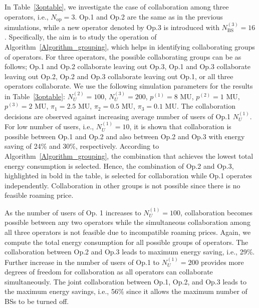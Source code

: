 \documentclass[10pt, letter, twocolumn]{IEEEtran}
\begin{document}
In Table~\ref{3optable}, we investigate the case of collaboration among three operators, i.e., $N_{\text{op}} = 3$. Op.1 and Op.2 are the same as in the previous simulations, while a new operator denoted by Op.3 is introduced with $N_{\text{BS}}^{(3)} = 16$. Specifically, the aim is to study the operation of Algorithm~\ref{Algorithm_grouping}, which helps in identifying collaborating groups of operators. For three operators, the possible collaborating groups can be as follows; Op.1 and Op.2 collaborate leaving out Op.3, Op.1 and Op.3 collaborate leaving out Op.2, Op.2 and Op.3 collaborate leaving out Op.1, or all three operators collaborate. We use the following simulation parameters for the results in Table~\ref{3optable}: $N_{U}^{(2)} = 100$, $N_{U}^{(3)} = 200$, $p^{(1)} = 8$ MU, $p^{(2)} = 1$ MU, $p^{(3)} = 2$ MU, $\pi_{1} = 2.5$ MU, $\pi_{2} = 0.5$ MU, $\pi_{3} = 0.1$ MU. The collaboration decisions are observed against increasing average number of users of Op.1 $N_{U}^{(1)}$. For low number of users, i.e., $N_{U}^{(1)}=10$, it is shown that collaboration is possible between Op.1 and Op.2 and also between Op.2 and Op.3 with energy saving of 24\% and 30\%, respectively. According to Algorithm~\ref{Algorithm_grouping}, the combination that achieves the lowest total energy consumption is selected. Hence, the combination of Op.2 and Op.3, highlighted in bold in the table, is selected for collaboration while Op.1 operates independently. Collaboration in other groups is not possible since there is no feasible roaming price.

As the number of users of Op. 1 increases to $N_{U}^{(1)} = 100$, collaboration becomes possible between any two operators while the simultaneous collaboration among all three operators is not feasible due to incompatible roaming prices. Again, we compute the total energy consumption for all possible groups of operators. The collaboration between Op.2 and Op.3 leads to maximum energy saving, i.e., 29\%. Further increase in the number of users of Op.1 to $N_{U}^{(1)} = 200$ provides more degrees of freedom for collaboration as all operators can collaborate simultaneously. The joint collaboration between Op.1, Op.2, and Op.3 leads to the maximum energy savings, i.e., 56\% since it allows the maximum number of BSs to be turned off.
\end{document}
